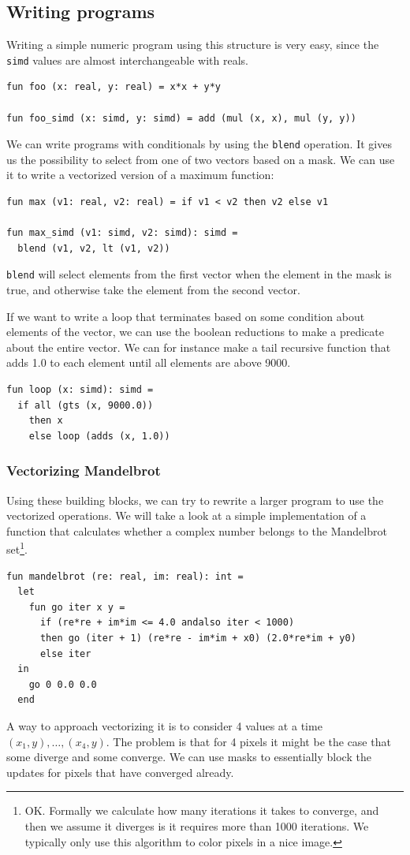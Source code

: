 \documentclass{article}
\begin{document}
\subsection{Writing programs}

Writing a simple numeric program using this structure is very easy, since the \verb!simd! values are almost interchangeable with reals.
\begin{verbatim}
fun foo (x: real, y: real) = x*x + y*y

fun foo_simd (x: simd, y: simd) = add (mul (x, x), mul (y, y))
\end{verbatim}
We can write programs with conditionals by using the \texttt{blend} operation. It gives us the possibility to select from one of two vectors based on a mask. We can use it to write a vectorized version of a maximum function:
\begin{verbatim}
fun max (v1: real, v2: real) = if v1 < v2 then v2 else v1

fun max_simd (v1: simd, v2: simd): simd =
  blend (v1, v2, lt (v1, v2))
\end{verbatim}
\texttt{blend} will select elements from the first vector when the element in the mask is true, and otherwise take the element from the second vector.

If we want to write a loop that terminates based on some condition about elements of the vector, we can use the boolean reductions to make a predicate about the entire vector.
We can for instance make a tail recursive function that adds 1.0 to each element until all elements are above 9000.
\begin{verbatim}
fun loop (x: simd): simd =
  if all (gts (x, 9000.0))
    then x
    else loop (adds (x, 1.0))
\end{verbatim}

\subsubsection{Vectorizing Mandelbrot}

Using these building blocks, we can try to rewrite a larger program to use the vectorized operations. We will take a look at a simple implementation of a function that calculates whether a complex number belongs to the Mandelbrot set\footnote{OK. Formally we calculate how many iterations it takes to converge, and then we assume it diverges is it requires more than 1000 iterations. We typically only use this algorithm to color pixels in a nice image.}.
\begin{verbatim}
fun mandelbrot (re: real, im: real): int =
  let
    fun go iter x y =
      if (re*re + im*im <= 4.0 andalso iter < 1000)
      then go (iter + 1) (re*re - im*im + x0) (2.0*re*im + y0)
      else iter
  in
    go 0 0.0 0.0
  end
\end{verbatim}
A way to approach vectorizing it is to consider 4 values at a time $(x_1, y), \ldots, (x_4, y)$. The problem is that for 4 pixels it might be the case that some diverge and some converge. We can use masks to essentially block the updates for pixels that have converged already.
\end{document}
